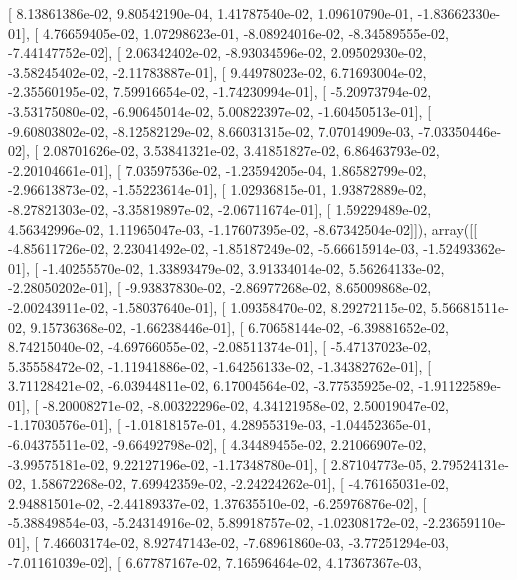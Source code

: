 \documentclass{article}
\begin{document}
       [  8.13861386e-02,   9.80542190e-04,   1.41787540e-02,
          1.09610790e-01,  -1.83662330e-01],
       [  4.76659405e-02,   1.07298623e-01,  -8.08924016e-02,
         -8.34589555e-02,  -7.44147752e-02],
       [  2.06342402e-02,  -8.93034596e-02,   2.09502930e-02,
         -3.58245402e-02,  -2.11783887e-01],
       [  9.44978023e-02,   6.71693004e-02,  -2.35560195e-02,
          7.59916654e-02,  -1.74230994e-01],
       [ -5.20973794e-02,  -3.53175080e-02,  -6.90645014e-02,
          5.00822397e-02,  -1.60450513e-01],
       [ -9.60803802e-02,  -8.12582129e-02,   8.66031315e-02,
          7.07014909e-03,  -7.03350446e-02],
       [  2.08701626e-02,   3.53841321e-02,   3.41851827e-02,
          6.86463793e-02,  -2.20104661e-01],
       [  7.03597536e-02,  -1.23594205e-04,   1.86582799e-02,
         -2.96613873e-02,  -1.55223614e-01],
       [  1.02936815e-01,   1.93872889e-02,  -8.27821303e-02,
         -3.35819897e-02,  -2.06711674e-01],
       [  1.59229489e-02,   4.56342996e-02,   1.11965047e-03,
         -1.17607395e-02,  -8.67342504e-02]]), array([[ -4.85611726e-02,   2.23041492e-02,  -1.85187249e-02,
         -5.66615914e-03,  -1.52493362e-01],
       [ -1.40255570e-02,   1.33893479e-02,   3.91334014e-02,
          5.56264133e-02,  -2.28050202e-01],
       [ -9.93837830e-02,  -2.86977268e-02,   8.65009868e-02,
         -2.00243911e-02,  -1.58037640e-01],
       [  1.09358470e-02,   8.29272115e-02,   5.56681511e-02,
          9.15736368e-02,  -1.66238446e-01],
       [  6.70658144e-02,  -6.39881652e-02,   8.74215040e-02,
         -4.69766055e-02,  -2.08511374e-01],
       [ -5.47137023e-02,   5.35558472e-02,  -1.11941886e-02,
         -1.64256133e-02,  -1.34382762e-01],
       [  3.71128421e-02,  -6.03944811e-02,   6.17004564e-02,
         -3.77535925e-02,  -1.91122589e-01],
       [ -8.20008271e-02,  -8.00322296e-02,   4.34121958e-02,
          2.50019047e-02,  -1.17030576e-01],
       [ -1.01818157e-01,   4.28955319e-03,  -1.04452365e-01,
         -6.04375511e-02,  -9.66492798e-02],
       [  4.34489455e-02,   2.21066907e-02,  -3.99575181e-02,
          9.22127196e-02,  -1.17348780e-01],
       [  2.87104773e-05,   2.79524131e-02,   1.58672268e-02,
          7.69942359e-02,  -2.24224262e-01],
       [ -4.76165031e-02,   2.94881501e-02,  -2.44189337e-02,
          1.37635510e-02,  -6.25976876e-02],
       [ -5.38849854e-03,  -5.24314916e-02,   5.89918757e-02,
         -1.02308172e-02,  -2.23659110e-01],
       [  7.46603174e-02,   8.92747143e-02,  -7.68961860e-03,
         -3.77251294e-03,  -7.01161039e-02],
       [  6.67787167e-02,   7.16596464e-02,   4.17367367e-03,
\end{document}
